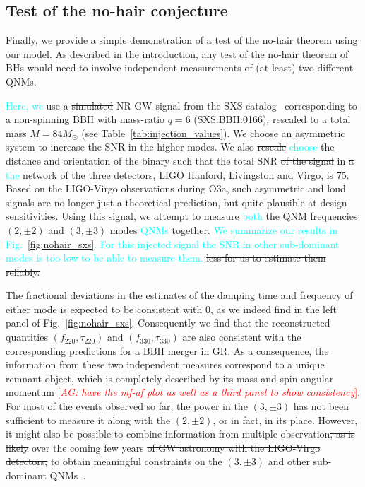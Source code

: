 \documentclass[twocolumn,prd,aps,superscriptaddress,preprintnumbers,tightenlines,showpacs,nofootinbib,eqsecnum,amsfonts,amsmath]{revtex4-1}
\newcommand{\abhi}[1]{\textcolor{red}{[\textit{AG: #1}]}}
\newcommand{\ab}[1]{\textcolor{cyan}{#1}}
\newcommand{\Mo}{M_{\odot}}
\newcommand{\fngr}[1]{f_{\text{#1}}}
\newcommand{\taungr}[1]{\tau_{\text{#1}}}
\begin{document}
\subsection{Test of the no-hair conjecture}\label{ssec:nohairtheorem}

Finally, we provide a simple demonstration of a test of the no-hair
theorem using our model. As described in the introduction, any test of
the no-hair theorem of BHs would need to involve independent
measurements of (at least) two different QNMs. 

\ab{Here, we} use a \sout{simulated} NR GW signal from the SXS catalog~\cite{} 
corresponding to a non-spinning BBH with mass-ratio $q=6$ (SXS:BBH:0166), 
\sout{rescaled to a} total mass $M=84 \Mo$ (see Table~\ref{tab:injection_values}). 
We choose an asymmetric system to increase the SNR in the higher modes. 
We also \sout{rescale} \ab{choose} the distance and orientation of the binary 
such that the total SNR \sout{of the signal} in \sout{a} \ab{the} network of 
the three detectors, LIGO Hanford, Livingston and
Virgo, is 75. Based on the LIGO-Virgo observations during O3a, such
asymmetric and loud signals are no longer just a theoretical
prediction, but quite plausible at design sensitivities. Using this
signal, we attempt to measure \ab{both} the \sout{QNM frequencies} $(2,\pm 2)$ and
$(3,\pm 3)$ \sout{modes} \ab{QNMs} \sout{together}. \ab{We summarize 
our results in Fig.~\ref{fig:nohair_sxs}. For this injected signal the SNR in
other sub-dominant modes is too low to be able to measure them.} \sout{less for us to estimate them reliably.}

The fractional deviations in the estimates of the damping time and
frequency of either mode is expected to be consistent with 0, as we
indeed find in the left panel of
Fig.~\ref{fig:nohair_sxs}. Consequently we find that the reconstructed
quantities $(\fngr{220}, \taungr{220})$ and $(\fngr{330},
\taungr{330})$ are also consistent with the corresponding predictions
for a BBH merger in GR. As a consequence, the information from these
two independent measures correspond to a unique remnant object, which
is completely described by its mass and spin angular momentum
\abhi{have the mf-af plot as well as a third panel to show
  consistency}. For most of the events observed so far, the power in
the $(3,\pm 3)$ has not been sufficient to measure it along with the
$(2,\pm 2)$, or in fact, in its place. However, it might also be
possible to combine information from multiple observation\sout{, as is
likely} over the coming few years \sout{of GW astronomy with the LIGO-Virgo
detectors,} to obtain meaningful constraints on the $(3,\pm 3)$ and
other sub-dominant QNMs~\cite{}.
\end{document}
